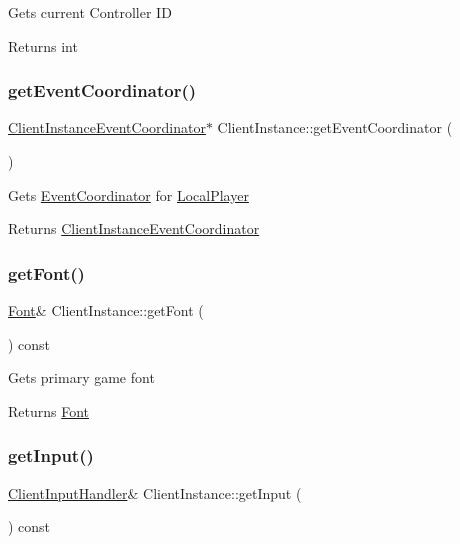 Gets current Controller ID \begin{DoxyReturn}{Returns}
int 
\end{DoxyReturn}
\mbox{\label{struct_client_instance_a3135a3b7826f22211bf69d688a8ac81b}} 
\subsubsection{\texorpdfstring{getEventCoordinator()}{getEventCoordinator()}}
{\footnotesize\ttfamily \mbox{\hyperlink{struct_client_instance_event_coordinator}{Client\+Instance\+Event\+Coordinator}}$\ast$ Client\+Instance\+::get\+Event\+Coordinator (\begin{DoxyParamCaption}{ }\end{DoxyParamCaption})}

Gets \mbox{\hyperlink{struct_event_coordinator}{Event\+Coordinator}} for \mbox{\hyperlink{struct_local_player}{Local\+Player}} \begin{DoxyReturn}{Returns}
\mbox{\hyperlink{struct_client_instance_event_coordinator}{Client\+Instance\+Event\+Coordinator}} 
\end{DoxyReturn}
\mbox{\label{struct_client_instance_a203b51aeab4a317a4e491af589b43eaa}} 
\subsubsection{\texorpdfstring{getFont()}{getFont()}}
{\footnotesize\ttfamily \mbox{\hyperlink{struct_font}{Font}}\& Client\+Instance\+::get\+Font (\begin{DoxyParamCaption}{ }\end{DoxyParamCaption}) const}

Gets primary game font \begin{DoxyReturn}{Returns}
\mbox{\hyperlink{struct_font}{Font}} 
\end{DoxyReturn}
\mbox{\label{struct_client_instance_a34c87a5603c81ffcc160f97bc6006949}} 
\subsubsection{\texorpdfstring{getInput()}{getInput()}}
{\footnotesize\ttfamily \mbox{\hyperlink{struct_client_input_handler}{Client\+Input\+Handler}}\& Client\+Instance\+::get\+Input (\begin{DoxyParamCaption}{ }\end{DoxyParamCaption}) const}

